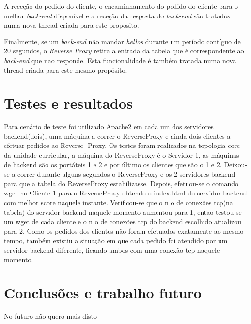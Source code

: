 \documentclass{llncs}
\begin{document}
\begin{itemize}
	A receção do pedido do cliente, o encaminhamento do pedido do cliente para o melhor \textit{back-end} disponível e a receção da resposta do \textit{back-end} são tratados numa nova thread criada para este propósito. \par
	Finalmente, se um \textit{back-end} não mandar \textit{hellos} durante um período contíguo de 20 segundos, o \textit{Reverse Proxy} retira a entrada da tabela que é correspondente ao \textit{back-end} que nao responde. Esta funcionalidade é também tratada numa nova thread criada para este mesmo propósito.
	
	
	

\end{itemize}
\newpage

\section{Testes e resultados}

Para cenário de teste foi utilizado Apache2 em cada um dos servidores backend(dois),
uma máquina a correr o ReverseProxy e ainda dois clientes a efetuar pedidos ao Reverse-
Proxy. Os testes foram realizados na topologia core da unidade curricular, a máquina do
ReverseProxy é o Servidor 1, as máquinas de backend são os portáteis 1 e 2 e por último
os clientes que são o 1 e 2.
Deixou-se a correr durante alguns segundos o ReverseProxy e os 2 servidores backend
para que a tabela do ReverseProxy estabilizasse. Depois, efetuou-se o comando wget no
Cliente 1 para o ReverseProxy obtendo o index.html do servidor backend com melhor score
naquele instante. Verificou-se que o n o de conexões tcp(na tabela) do servidor backend
naquele momento aumentou para 1, então testou-se um wget de cada cliente e o n o de
conexões tcp do backend escolhido atualizou para 2. Como os pedidos dos clientes não
foram efetuados exatamente ao mesmo tempo, também existiu a situação em que cada
pedido foi atendido por um servidor backend diferente, ficando ambos com uma conexão
tcp naquele momento.

\newpage

\section{Conclusões e trabalho futuro}

No futuro não quero mais disto

\newpage
%
\end{document}
